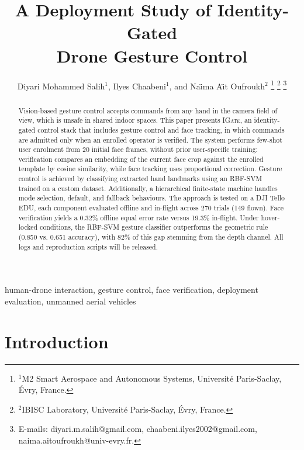 \documentclass[conference]{IEEEtran}
\newcommand{\method}[1]{\textsc{#1}}
\begin{document}
\title{A Deployment Study of Identity-Gated\\Drone Gesture Control}

\author{Diyari Mohammed Salih$^{1}$,
        Ilyes Chaabeni$^{1}$,
        and Na\"{\i}ma A\"{\i}t Oufroukh$^{2}$%
\thanks{$^{1}$M2 Smart Aerospace and Autonomous Systems,
Universit\'e Paris-Saclay, \'Evry, France.}%
\thanks{$^{2}$IBISC Laboratory, Universit\'e Paris-Saclay, \'Evry, France.}%
\thanks{E-mails: diyari.m.salih@gmail.com,
chaabeni.ilyes2002@gmail.com,
naima.aitoufroukh@univ-evry.fr.}%
}

\maketitle

\begin{abstract}
Vision-based gesture control accepts commands from any hand in the camera field of view, which is unsafe in shared indoor spaces. 
This paper presents \method{IGate}, an identity-gated control stack that includes gesture control and face tracking, in which commands are admitted only when an enrolled operator is verified. The system performs few-shot user enrolment from 20 initial face frames, without prior user-specific training: verification compares an embedding of the current face crop against the enrolled template by cosine similarity, while face tracking uses proportional correction. Gesture control is achieved by classifying extracted hand landmarks using an RBF-SVM trained on a custom dataset. Additionally, a hierarchical finite-state machine handles mode selection, default, and fallback behaviours.
The approach is tested on a DJI Tello EDU, each component evaluated offline and in-flight across 270 trials (149 flown). Face verification yields a 0.32\% offline equal error rate versus 19.3\% in-flight. Under hover-locked conditions, the RBF-SVM gesture classifier outperforms the geometric rule (0.850 vs. 0.651 accuracy), with 82\% of this gap stemming from the depth channel. All logs and reproduction scripts will be released.
\end{abstract}

\begin{IEEEkeywords}
human-drone interaction, gesture control, face verification, deployment
evaluation, unmanned aerial vehicles
\end{IEEEkeywords}

\section{Introduction}
\end{document}

